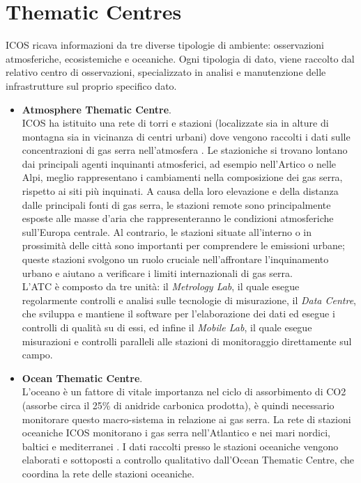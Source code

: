 \section{Thematic Centres}
\label{section:thematic}
ICOS ricava informazioni da tre diverse tipologie di ambiente:
osservazioni atmosferiche, ecosistemiche e oceaniche. Ogni
tipologia di dato, viene raccolto dal relativo centro di osservazioni,
specializzato in analisi e manutenzione delle infrastrutture sul proprio
specifico dato.

\begin{itemize}
    \item \textbf{Atmosphere Thematic Centre}.\\
    ICOS ha istituito una rete di torri e stazioni
    (localizzate sia in alture di montagna sia in vicinanza
    di centri urbani)
    dove vengono raccolti i dati sulle concentrazioni di gas
    serra 
    nell'atmosfera \cite{AtmosphereObservationsICOS}. Le stazioniche si trovano lontano dai
    principali agenti inquinanti atmosferici, ad esempio
    nell'Artico o nelle Alpi, meglio
    rappresentano i cambiamenti nella composizione
    dei gas serra, rispetto ai siti più inquinati.
    A causa della loro elevazione e della distanza dalle
    principali fonti di gas serra,
    le stazioni remote sono principalmente esposte
    alle masse d'aria che rappresenteranno le
    condizioni atmosferiche sull'Europa centrale.
    Al contrario, le stazioni situate all'interno o
    in prossimità delle città sono importanti per
    comprendere le emissioni urbane; queste stazioni
    svolgono un ruolo cruciale nell'affrontare
    l'inquinamento urbano e aiutano a verificare
    i limiti internazionali di gas serra.\\

    L'ATC è composto da tre unità: il \textit{Metrology Lab}, il quale
    esegue regolarmente controlli e analisi sulle tecnologie di misurazione,
    il \textit{Data Centre}, che sviluppa e mantiene il software
    per l'elaborazione dei dati ed esegue i controlli di qualità su di essi,
    ed infine il \textit{Mobile Lab}, il quale esegue misurazioni e controlli
    paralleli alle stazioni di monitoraggio direttamente sul campo.

    \item \textbf{Ocean Thematic Centre}.\\
    L'oceano è un fattore di vitale importanza nel ciclo di assorbimento
    di CO2 (assorbe circa il 25\% di anidride carbonica prodotta), è quindi
    necessario monitorare questo macro-sistema in relazione ai gas serra.
    La rete di stazioni oceaniche ICOS monitorano i gas serra
    nell'Atlantico e nei mari nordici, baltici e mediterranei \cite{OceanObservationsICOS}.
    I dati raccolti presso le stazioni oceaniche vengono elaborati
    e sottoposti a controllo qualitativo dall'Ocean Thematic Centre,
    che coordina la rete delle stazioni oceaniche.\\


\end{itemize}
